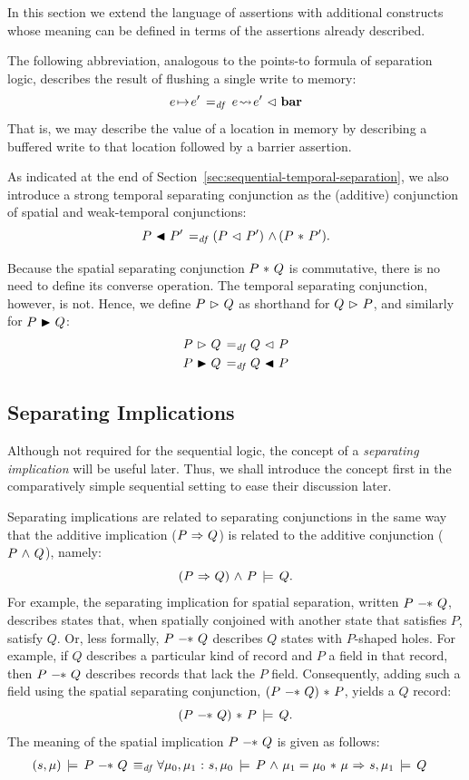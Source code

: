 \documentclass[11pt]{report}
\begin{document}
In this section we extend the language of assertions with additional constructs whose meaning can be defined in terms of the assertions already described. 

The following abbreviation, analogous to the points-to formula of separation logic, describes the result of flushing a single write to memory: \[
    e \!\mapsto\! e' \operatorname{\;=_{\mathit{df}}\;} e \!\leadsto\! e' \operatorname{\,\vartriangleleft\,} \mathbf{bar} \] That is, we may describe the value of a location in memory by describing a buffered write to that location followed by a barrier assertion. 

As indicated at the end of Section~\ref{sec:sequential-temporal-separation}, we also introduce a strong temporal separating conjunction as the (additive) conjunction of spatial and weak-temporal conjunctions: \[ P \operatorname{\,\blacktriangleleft\,} P' \operatorname{\;=_{\mathit{df}}\;} (P \operatorname{\,\vartriangleleft\,} P') \operatorname{\,\wedge\,} (P \operatorname{\,\ast\,} P').\]

Because the spatial separating conjunction $P \operatorname{\,\ast\,} Q$ is commutative, there is no need to define its converse operation. The temporal separating conjunction, however, is not. Hence, we define $P \operatorname{\,\vartriangleright\,} Q$ as shorthand for $Q \operatorname{\,\vartriangleright\,} P$, and similarly for $P \operatorname{\,\blacktriangleright\,} Q$: \begin{align*}
  P \operatorname{\,\vartriangleright\,} Q \operatorname{\;=_{\mathit{df}}\;} & Q \operatorname{\,\vartriangleleft\,} P \\ 
  P \operatorname{\,\blacktriangleright\,} Q \operatorname{\;=_{\mathit{df}}\;} & Q \operatorname{\,\blacktriangleleft\,} P \\ 
\end{align*}

\subsection{Separating Implications}
\label{sec:separating-implications}

Although not required for the sequential logic, the concept of a \emph{separating implication} will be useful later. Thus, we shall introduce the concept first in the comparatively simple sequential setting to ease their discussion later.

Separating implications are related to separating conjunctions in the same way that the additive implication ($P \operatorname{\,\Rightarrow\,} Q$) is related to the additive conjunction ($P \operatorname{\,\wedge\,} Q$), namely: \[ (P \operatorname{\,\Rightarrow\,} Q) \operatorname{\,\wedge\,} P \,\models\, Q.\] For example, the separating implication for spatial separation, written $P \fsepi Q$, describes states that, when spatially conjoined with another state that satisfies $P$, satisfy $Q$. Or, less formally, $P \fsepi Q$ describes $Q$ states with $P$-shaped holes. For example, if $Q$ describes a particular kind of record and $P$ a field in that record, then $P \fsepi Q$ describes records that lack the $P$ field. Consequently, adding such a field using the spatial separating conjunction, $(P \fsepi Q) \fsep P$, yields a $Q$ record: \[ (P \fsepi Q) \fsep P \sentails Q.\] The meaning of the spatial implication $P \fsepi Q$ is given as follows: \begin{align*} (s,\mu) \sentails P \fsepi Q \iffdef & \forall \mu_0,\mu_1 \st s,\mu_0 \sentails P \conj \mu_1 = \mu_0 \fsep \mu \onlyif  s,\mu_1 \sentails Q \end{align*} 
\end{document}
